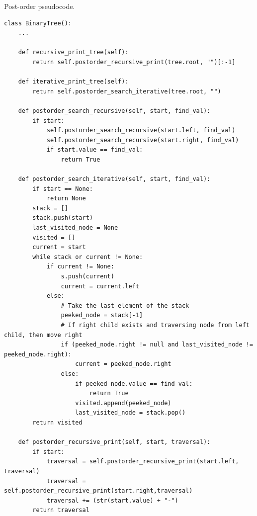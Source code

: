 \begin{algorithm}[H]
	\DontPrintSemicolon
	\LinesNumbered
  	\;
\caption{Post-order pseudocode.}
\end{algorithm}

\begin{lstlisting}[firstnumber=1, caption={Recursive and iterative implementation of post-order traversal.}]
class BinaryTree():
	...

	def recursive_print_tree(self):
		return self.postorder_recursive_print(tree.root, "")[:-1]
	
	def iterative_print_tree(self):
		return self.postorder_search_iterative(tree.root, "")

	def postorder_search_recursive(self, start, find_val):
		if start:
			self.postorder_search_recursive(start.left, find_val)
			self.postorder_search_recursive(start.right, find_val)
			if start.value == find_val:
				return True

	def postorder_search_iterative(self, start, find_val):
		if start == None:
			return None
		stack = []
		stack.push(start)
		last_visited_node = None
		visited = []
		current = start
		while stack or current != None:
			if current != None:
				s.push(current)
				current = current.left
			else:
				# Take the last element of the stack
				peeked_node = stack[-1]
				# If right child exists and traversing node from left child, then move right
				if (peeked_node.right != null and last_visited_node != peeked_node.right):
					current = peeked_node.right
				else:
					if peeked_node.value == find_val:
						return True
					visited.append(peeked_node)
					last_visited_node = stack.pop()
		return visited

	def postorder_recursive_print(self, start, traversal):
		if start:
			traversal = self.postorder_recursive_print(start.left, traversal)
			traversal = self.postorder_recursive_print(start.right,traversal)
			traversal += (str(start.value) + "-")
		return traversal
\end{lstlisting}

